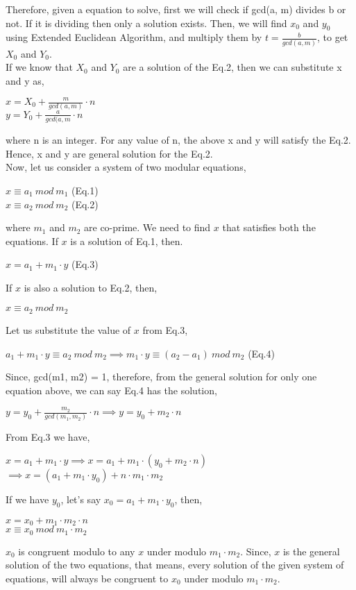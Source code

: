 \documentclass[11pt]{article}
\begin{document}
Therefore, given a equation to solve, first we will check if gcd(a, m) divides b or not. If it is dividing then only a solution exists. Then, we will find $x_0$ and $y_0$ using Extended Euclidean Algorithm, and multiply them by $t = \frac{b}{gcd(a, m)}$, to get $X_0$ and $Y_0$.\\
\newline
If we know that $X_0$ and $Y_0$ are a solution of the Eq.2, then we can substitute x and y as, 
\begin{center}
    $x = X_0 + \frac{m}{gcd(a, m)} \cdot n$\\
    \vspace{1mm}
    $y = Y_0 + \frac{a}{gcd(a, m} \cdot n$
\end{center}
where n is an integer. For any value of n, the above x and y will satisfy the Eq.2. Hence, x and y are general solution for the Eq.2.\\
\newline
Now, let us consider a system of two modular equations,
\begin{center}
    $x \equiv a_1 \ mod \ m_1$   (Eq.1)\\
    $x \equiv a_2 \ mod \ m_2$   (Eq.2)  
\end{center}
where $m_1$ and $m_2$ are co-prime. We need to find $x$ that satisfies both the equations. If $x$ is a solution of Eq.1, then.
\begin{center}
    $x = a_1 + m_1 \cdot y$  (Eq.3)
\end{center}
If $x$ is also a solution to Eq.2, then,
\begin{center}
    $x \equiv a_2 \ mod \ m_2$
\end{center}
Let us substitute the value of $x$ from Eq.3,
\begin{center}
    $a_1 + m_1 \cdot y \equiv a_2 \ mod \ m_2 \implies m_1 \cdot y \equiv (a_2 - a_1) \ mod \ m_2$   (Eq.4)
\end{center}
Since, gcd(m1, m2) = 1, therefore, from the general solution for only one equation above, we can say Eq.4 has the solution,
\begin{center}
    $y = y_0 + \frac{m_2}{gcd(m_1, m_2)} \cdot n \implies y = y_0 + m_2 \cdot n$
\end{center}
From Eq.3 we have, 
\begin{center}
    $x = a_1 + m_1 \cdot y \implies x = a_1 + m_1 \cdot (y_0 + m_2 \cdot n)$\\
    \vspace{1mm}
    $\implies x = (a_1 + m_1 \cdot y_0) + n \cdot m_1 \cdot m_2$
\end{center}
If we have $y_0$, let's say $x_0 = a_1 + m_1 \cdot y_0$, then,
\begin{center}
    $x = x_0 + m_1 \cdot m_2 \cdot n$\\
    \vspace{1mm}
    $x \equiv x_0 \ mod \ m_1 \cdot m_2$
\end{center}
$x_0$ is congruent modulo to any $x$ under modulo $m_1 \cdot m_2$. Since, $x$ is the general solution of the two equations, that means, every solution of the given system of equations, will always be congruent to $x_0$ under modulo $m_1 \cdot m_2$.
\end{document}

